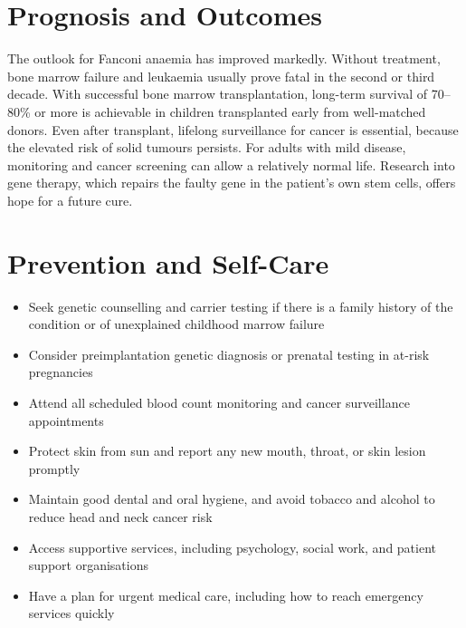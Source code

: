 \section*{Prognosis and Outcomes}
The outlook for Fanconi anaemia has improved markedly. Without treatment, bone marrow failure and leukaemia usually prove fatal in the second or third decade. With successful bone marrow transplantation, long-term survival of 70--80\% or more is achievable in children transplanted early from well-matched donors. Even after transplant, lifelong surveillance for cancer is essential, because the elevated risk of solid tumours persists. For adults with mild disease, monitoring and cancer screening can allow a relatively normal life. Research into gene therapy, which repairs the faulty gene in the patient's own stem cells, offers hope for a future cure.

\section*{Prevention and Self-Care}
\begin{itemize}
    \item Seek genetic counselling and carrier testing if there is a family history of the condition or of unexplained childhood marrow failure
    \item Consider preimplantation genetic diagnosis or prenatal testing in at-risk pregnancies
    \item Attend all scheduled blood count monitoring and cancer surveillance appointments
    \item Protect skin from sun and report any new mouth, throat, or skin lesion promptly
    \item Maintain good dental and oral hygiene, and avoid tobacco and alcohol to reduce head and neck cancer risk
    \item Access supportive services, including psychology, social work, and patient support organisations
    \item Have a plan for urgent medical care, including how to reach emergency services quickly
\end{itemize}

